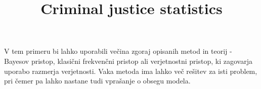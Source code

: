 \documentclass[mat1, tisk]{fmfdelo}
\title{Criminal justice statistics}
\theoremstyle{definition} %
\theoremstyle{trditev} %
\theoremstyle{izrek}
\begin{document}
V tem primeru bi lahko uporabili večina zgoraj opisanih metod in teorij - Bayesov pristop, klasični frekvenčni pristop ali 
verjetnostni pristop, ki zagovarja uporabo razmerja verjetnosti.  Vaka metoda ima lahko več rešitev za isti problem, pri čemer pa lahko nastane 
tudi vprašanje o obsegu modela.










\pagebreak

\end{document}
